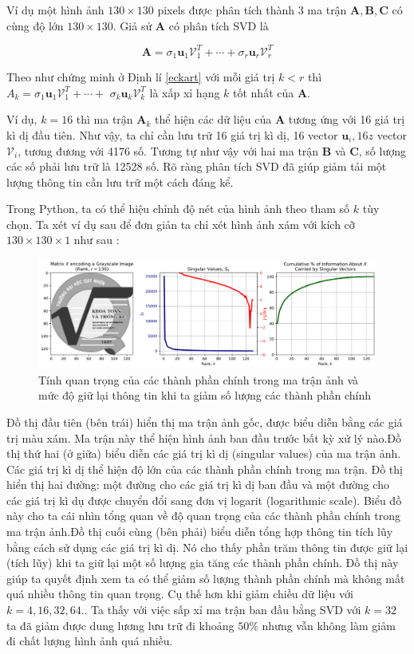 \documentclass[12pt,a4paper,oneside]{report}
\numberwithin{equation}{section}
\begin{document}
Ví dụ một hình ảnh $130 \times 130$ pixels được phân tích thành 3 ma trận $\mathbf{A}, \mathbf{B}, \mathbf{C}$ có cùng độ lớn $130 \times 130$. Giả sử $\mathbf{A}$ có phân tích SVD là

$$
\mathbf{A}=\sigma_{1} \mathbf{u}_{1} \mathcal{V}_{1}^{T}+\cdots+\sigma_{r} \mathbf{u}_{r} \mathcal{V}_{r}^{T}
$$

Theo như chứng minh ở Định lí \ref{eckart} với mỗi giá trị $k<r$ thì $A_{k}=\sigma_{1} \mathbf{u}_{1} \mathcal{V}_{1}^{T}+\cdots+$ $\sigma_{k} \mathbf{u}_{k} \mathcal{V}_{k}^{T}$ là xấp xỉ hạng $k$ tốt nhất của $\mathbf{A}$.

Ví dụ, $k=16$ thì ma trận $\mathbf{A}_{k}$ thể hiện các dữ liệu của $\mathbf{A}$ tương ứng với 16 giá trị kì dị đầu tiên. Như vậy, ta chỉ cần lưu trữ 16 giá trị kì dị, 16 vector $\mathbf{u}_{i}, 16z $ vector $\mathcal{V}_{i}$, tương đương với 4176 số. Tương tự như vậy với hai ma trận $\mathbf{B}$ và $\mathbf{C}$, số lượng các số phải lưu trữ là 12528 số. Rõ ràng phân tích SVD đã giúp giảm tải một lượng thông tin cần lưu trữ một cách đáng kể.

Trong  Python, ta có thể hiệu chỉnh độ nét của hình ảnh theo tham số $k$ tùy chọn. Ta xét ví dụ sau để đơn giản ta chỉ xét hình ảnh xám với kích cỡ $130 \times 130 \times1 $ như sau :

\begin{figure}[htp]
	\centering
	\includegraphics[scale=0.5]{image-singular-values.png}
	\caption{Tính quan trọng của các thành phần chính trong ma trận ảnh và mức độ giữ lại thông tin khi ta giảm số lượng các thành phần chính}
	\label{fig:svd_sigular}
\end{figure}

Đồ thị đầu tiên (bên trái) hiển thị ma trận ảnh gốc, được biểu diễn bằng các giá trị màu xám. Ma trận này thể hiện hình ảnh ban đầu trước bất kỳ xử lý nào.Đồ thị thứ hai (ở giữa) biểu diễn các giá trị kì dị (singular values) của ma trận ảnh. Các giá trị kì dị thể hiện độ lớn của các thành phần chính trong ma trận. Đồ thị hiển thị hai đường: một đường cho các giá trị kì dị ban đầu và một đường cho các giá trị kì dụ được chuyển đổi sang đơn vị logarit (logarithmic scale). Biểu đồ này cho ta cái nhìn tổng quan về độ quan trọng của các thành phần chính trong ma trận ảnh.Đồ thị cuối cùng (bên phải) biểu diễn tổng hợp thông tin tích lũy bằng cách sử dụng các giá trị kì dị. Nó cho thấy phần trăm thông tin được giữ lại (tích lũy) khi ta giữ lại một số lượng gia tăng các thành phần chính. Đồ thị này giúp ta quyết định xem ta có thể giảm số lượng thành phần chính mà không mất quá nhiều thông tin quan trọng.
Cụ thế hơn khi giảm chiều dữ liệu với $k = 4,16, 32 ,64.$. Ta thấy với việc sấp xỉ ma trận ban đầu bằng SVD với $ k=32 $ ta đã giảm được dung lương lưu trữ đi khoảng $50\%$ nhưng vẫn không làm giảm đi chất lượng hình ảnh quá nhiều.
\end{document}
